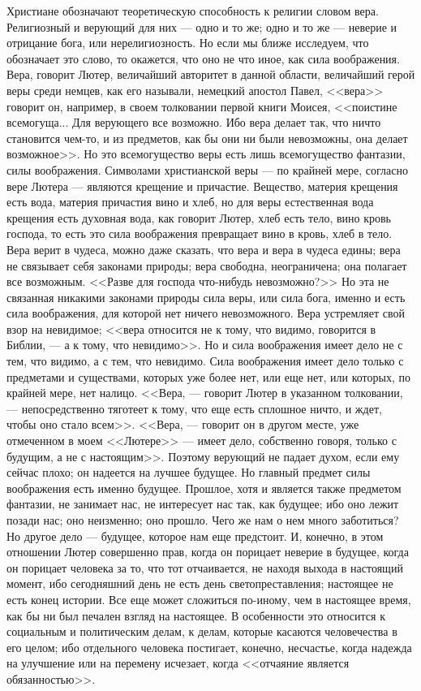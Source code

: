 \documentclass[12pt]{article}
\begin{document}
Христиане обозначают теоретическую способность к религии словом вера. Религиозный и верующий для них --- одно и то же; одно и то же --- неверие и отрицание бога, или нерелигиозность. Но если мы ближе исследуем, что обозначает это слово, то окажется, что оно не что иное, как сила воображения. Вера, говорит Лютер, величайший авторитет в данной области, величайший герой веры среди немцев, как его называли, немецкий апостол Павел, <<вера>>  говорит он, например, в своем толковании первой книги Моисея, <<поистине всемогуща... Для верующего все возможно. Ибо вера делает так, что ничто становится чем-то, и из предметов, как бы они ни были невозможны, она делает возможное>>. Но это всемогущество веры есть лишь всемогущество фантазии, силы воображения. Символами христианской веры --- по крайней мере, согласно вере Лютера --- являются крещение и причастие. Вещество, материя крещения есть вода, материя причастия вино и хлеб, но для веры естественная вода крещения есть духовная вода, как говорит Лютер, хлеб есть тело, вино кровь господа, то есть это сила воображения превращает вино в кровь, хлеб в тело. Вера верит в чудеса, можно даже сказать, что вера и вера в чудеса едины; вера не связывает себя законами природы; вера свободна, неограничена; она полагает все возможным. <<Разве для господа что-нибудь невозможно?>> Но эта не связанная никакими законами природы сила веры, или сила бога, именно и есть сила воображения, для которой нет ничего невозможного. Вера устремляет свой взор на невидимое; <<вера относится не к тому, что видимо, говорится в Библии, --- а к тому, что невидимо>>. Но и сила воображения имеет дело не с тем, что видимо, а с тем, что невидимо. Сила воображения имеет дело только с предметами и существами, которых уже более нет, или еще нет, или которых, по крайней мере, нет налицо. <<Вера, --- говорит Лютер в указанном толковании, --- непосредственно тяготеет к тому, что еще есть сплошное ничто, и ждет, чтобы оно стало всем>>. <<Вера, --- говорит он в другом месте, уже отмеченном в моем <<Лютере>>  --- имеет дело, собственно говоря, только с будущим, а не с настоящим>>. Поэтому верующий не падает духом, если ему сейчас плохо; он надеется на лучшее будущее. Но главный предмет силы воображения есть именно будущее. Прошлое, хотя и является также предметом фантазии, не занимает нас, не интересует нас так, как будущее; ибо оно лежит позади нас; оно неизменно; оно прошло. Чего же нам о нем много заботиться? Но другое дело --- будущее, которое нам еще предстоит. И, конечно, в этом отношении Лютер совершенно прав, когда он порицает неверие в будущее, когда он порицает человека за то, что тот отчаивается, не находя выхода в настоящий момент, ибо сегодняшний день не есть день светопреставления; настоящее не есть конец истории. Все еще может сложиться по-иному, чем в настоящее время, как бы ни был печален взгляд на настоящее. В особенности это относится к социальным и политическим делам, к делам, которые касаются человечества в его целом; ибо отдельного человека постигает, конечно, несчастье, когда надежда на улучшение или на перемену исчезает, когда <<отчаяние является обязанностью>>. 
\end{document}
